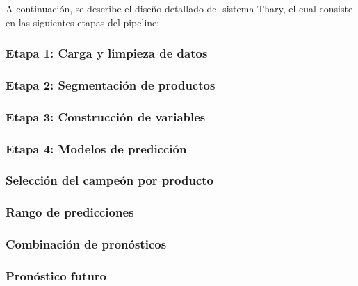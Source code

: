 A continuación, se describe el diseño detallado del sistema Thary, el cual consiste en las siguientes etapas del pipeline:

\subsubsection{Etapa 1: Carga y limpieza de datos}


\subsubsection{Etapa 2: Segmentación de productos}


\subsubsection{Etapa 3: Construcción de variables}


\subsubsection{Etapa 4: Modelos de predicción}


\subsubsection{Selección del campeón por producto}\label{sec:seleccion-campeon}


\subsubsection{Rango de predicciones}


\subsubsection{Combinación de pronósticos}\label{sec:combinacion-pronosticos}


\subsubsection{Pronóstico futuro}


